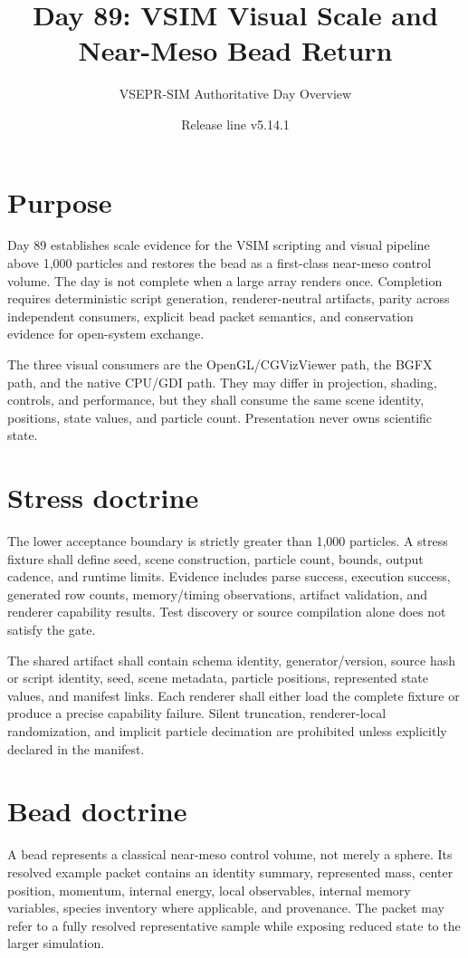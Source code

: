 \documentclass[10pt]{article}
\title{Day 89: VSIM Visual Scale and Near-Meso Bead Return}
\author{VSEPR-SIM Authoritative Day Overview}
\date{Release line v5.14.1}
\begin{document}
\maketitle

\section*{Purpose}
Day 89 establishes scale evidence for the VSIM scripting and visual pipeline above 1,000 particles and restores the bead as a first-class near-meso control volume. The day is not complete when a large array renders once. Completion requires deterministic script generation, renderer-neutral artifacts, parity across independent consumers, explicit bead packet semantics, and conservation evidence for open-system exchange.

The three visual consumers are the OpenGL/CGVizViewer path, the BGFX path, and the native CPU/GDI path. They may differ in projection, shading, controls, and performance, but they shall consume the same scene identity, positions, state values, and particle count. Presentation never owns scientific state.

\section*{Stress doctrine}
The lower acceptance boundary is strictly greater than 1,000 particles. A stress fixture shall define seed, scene construction, particle count, bounds, output cadence, and runtime limits. Evidence includes parse success, execution success, generated row counts, memory/timing observations, artifact validation, and renderer capability results. Test discovery or source compilation alone does not satisfy the gate.

The shared artifact shall contain schema identity, generator/version, source hash or script identity, seed, scene metadata, particle positions, represented state values, and manifest links. Each renderer shall either load the complete fixture or produce a precise capability failure. Silent truncation, renderer-local randomization, and implicit particle decimation are prohibited unless explicitly declared in the manifest.

\section*{Bead doctrine}
A bead represents a classical near-meso control volume, not merely a sphere. Its resolved example packet contains an identity summary, represented mass, center position, momentum, internal energy, local observables, internal memory variables, species inventory where applicable, and provenance. The packet may refer to a fully resolved representative sample while exposing reduced state to the larger simulation.
\end{document}
